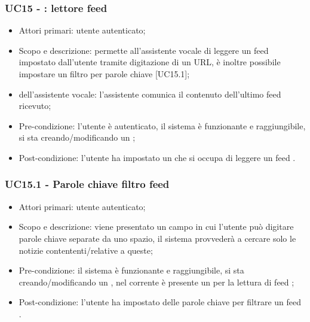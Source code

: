 \subsubsection{UC15 - : lettore feed }
\begin{itemize}
	\item  Attori primari: utente autenticato;
	\item  Scopo e descrizione: permette all'assistente vocale di leggere un feed  impostato dall'utente tramite digitazione di un URL, è inoltre possibile impostare un filtro per parole chiave [UC15.1];%
	\item  {} dell'assistente vocale: l'assistente comunica il contenuto dell'ultimo feed  ricevuto;
	\item  Pre-condizione: l'utente è autenticato, il sistema è funzionante e raggiungibile, si sta creando/modificando un ;
	\item  Post-condizione: l'utente ha impostato un  che si occupa di leggere un feed .
\end{itemize}
\subsubsection{UC15.1 - Parole chiave filtro feed }
\begin{itemize}
	\item  Attori primari: utente autenticato;
	\item  Scopo e descrizione: viene presentato un campo in cui l'utente può digitare parole chiave separate da uno spazio, il sistema provvederà a cercare solo le notizie contententi/relative a queste;
	\item  Pre-condizione: il sistema è funzionante e raggiungibile, si sta creando/modificando un , nel  corrente è presente un  per la lettura di feed ;
	\item  Post-condizione: l'utente ha impostato delle parole chiave per filtrare un feed .
\end{itemize}
